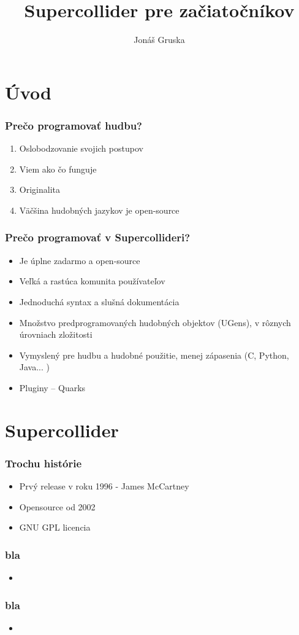 \documentclass{beamer}
\title{Supercollider pre začiatočníkov}
\author{Jonáš Gruska}
\institute[Royal Conservatory] %
{
		Institute of Sonology\\
		Den Haag, Netherlands
	}
\date{}
\begin{document}
\begin{frame}
\titlepage
\end{frame}

\section{Úvod}

\begin{frame}
\frametitle{Prečo programovať hudbu?}
	\begin{enumerate}
		\item Oslobodzovanie svojich postupov
		\item Viem ako čo funguje
		\item Originalita
		\item Väčšina hudobných jazykov je open-source
	\end{enumerate}
\end{frame}

\begin{frame}
\frametitle{Prečo programovať v Supercollideri?}
	\begin{itemize}
		\item Je úplne zadarmo a open-source
		\item Veľká a rastúca komunita používateľov
		\item Jednoduchá syntax a slušná dokumentácia
		\item Množstvo predprogramovaných hudobných objektov (UGens), v rôznych úrovniach zložitosti
		\item Vymyslený pre hudbu a hudobné použitie, menej zápasenia (C, Python, Java... )
		\item Pluginy -- Quarks 
	\end{itemize}
\end{frame}

\section{Supercollider}
\begin{frame}
	\frametitle{Trochu histórie}
	\begin{itemize}
		\item Prvý release v roku 1996 - James McCartney
		\item Opensource od 2002
		\item GNU GPL licencia
	\end{itemize}
\end{frame}

\begin{frame}
	\frametitle{bla}
	\begin{itemize}
		\item
	\end{itemize}
\end{frame}

\begin{frame}
	\frametitle{bla}
	\begin{itemize}
		\item
	\end{itemize}
\end{frame}
\end{document}
